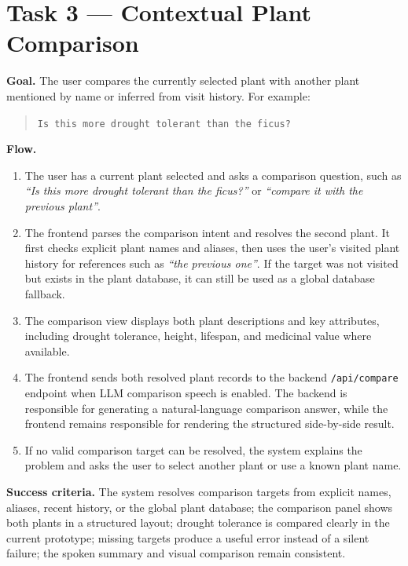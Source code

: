 \documentclass[12pt,a4paper]{article}
\newcommand{\tasksub}[1]{\par\smallskip\noindent\textbf{#1}\quad\ignorespaces}
\begin{document}
\section{Task 3 --- Contextual Plant Comparison}
\tasksub{Goal.} The user compares the currently selected plant with another
plant mentioned by name or inferred from visit history. For example:

\begin{quote}
\texttt{Is this more drought tolerant than the ficus?}
\end{quote}

\tasksub{Flow.}
\begin{enumerate}
    \item The user has a current plant selected and asks a comparison question,
    such as \emph{``Is this more drought tolerant than the ficus?''} or
    \emph{``compare it with the previous plant''}.
    \item The frontend parses the comparison intent and resolves the second
    plant. It first checks explicit plant names and aliases, then uses the
    user's visited plant history for references such as \emph{``the previous
    one''}. If the target was not visited but exists in the plant database, it
    can still be used as a global database fallback.
    \item The comparison view displays both plant descriptions and key
    attributes, including drought tolerance, height, lifespan, and medicinal
    value where available.
    \item The frontend sends both resolved plant records to the backend
    \texttt{/api/compare} endpoint when LLM comparison speech is enabled.
    The backend is responsible for generating a natural-language comparison
    answer, while the frontend remains responsible for rendering the
    structured side-by-side result.
    \item If no valid comparison target can be resolved, the system explains
    the problem and asks the user to select another plant or use a known plant
    name.
\end{enumerate}

\tasksub{Success criteria.} The system resolves comparison targets from
explicit names, aliases, recent history, or the global plant database; the
comparison panel shows both plants in a structured layout; drought tolerance
is compared clearly in the current prototype; missing targets produce a useful
error instead of a silent failure; the spoken summary and visual comparison
remain consistent.
\end{document}

